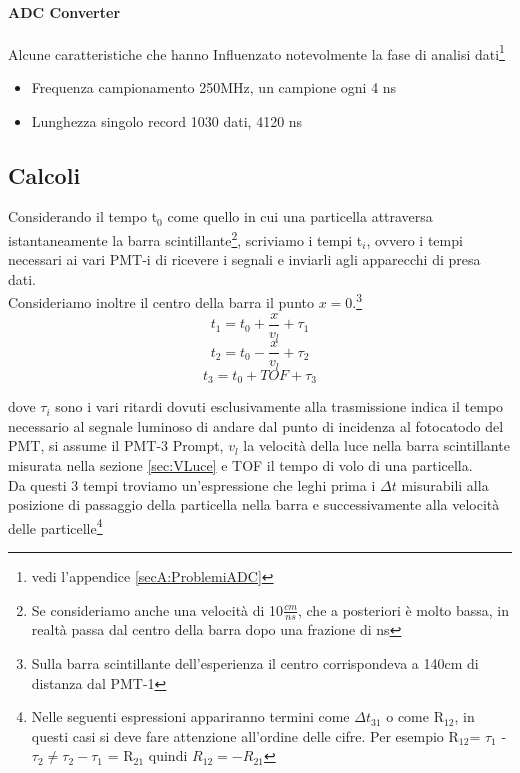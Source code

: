 \documentclass[a4paper]{article}
\begin{document}
\paragraph{ADC Converter}
Alcune caratteristiche che hanno Influenzato notevolmente la fase di analisi dati\footnote{vedi l'appendice \ref{secA:ProblemiADC}}
\begin{itemize}
\item Frequenza campionamento 250MHz, un campione ogni 4 ns
\item Lunghezza singolo record 1030 dati, 4120 ns
\end{itemize}

\subsection{Calcoli}
\label{sec:CalcoliVMu}
Considerando il tempo t$_0$ come quello in cui una particella attraversa istantaneamente la barra scintillante\footnote{Se consideriamo anche una velocità di 10$\frac{cm}{ns}$, che a posteriori è molto bassa, in realtà passa dal centro della barra dopo una frazione di ns}, scriviamo i tempi t$_i$, ovvero i tempi necessari ai vari PMT-i di ricevere i segnali e inviarli agli apparecchi di presa dati.\\
Consideriamo inoltre il centro della barra il punto $x = 0$.\footnote{Sulla barra scintillante dell'esperienza il centro corrispondeva a 140cm di distanza dal PMT-1}
\begin{equation}
t_1 = t_0 + \frac{x}{v_l} + \tau_1
\end{equation}
\begin{equation}
t_2 = t_0 - \frac{x}{v_l} + \tau_2
\end{equation}
\begin{equation}
t_3 = t_0 + TOF + \tau_3
\label{eq:TempiPMT}
\end{equation}

dove $\tau_i$ sono i vari ritardi dovuti esclusivamente alla trasmissione indica il tempo necessario al segnale luminoso di andare dal punto di incidenza al fotocatodo del PMT, si assume il PMT-3 Prompt, $v_l$ la velocità della luce nella barra scintillante misurata nella sezione \ref{sec:VLuce} e TOF il tempo di volo di una particella.\\
Da questi 3 tempi troviamo un'espressione che leghi prima i $\Delta t$ misurabili alla posizione di passaggio della particella nella barra e successivamente alla velocità delle particelle\footnote{Nelle seguenti espressioni appariranno termini come $\Delta t_{31}$ o come R$_{12}$, in questi casi si deve fare attenzione all'ordine delle cifre. Per esempio R$_{12}$= $\tau_1$ - $\tau_2 \neq \tau_2 - \tau_1$ = R$_{21}$ quindi $R_{12}=-R_{21}$}
\end{document}
